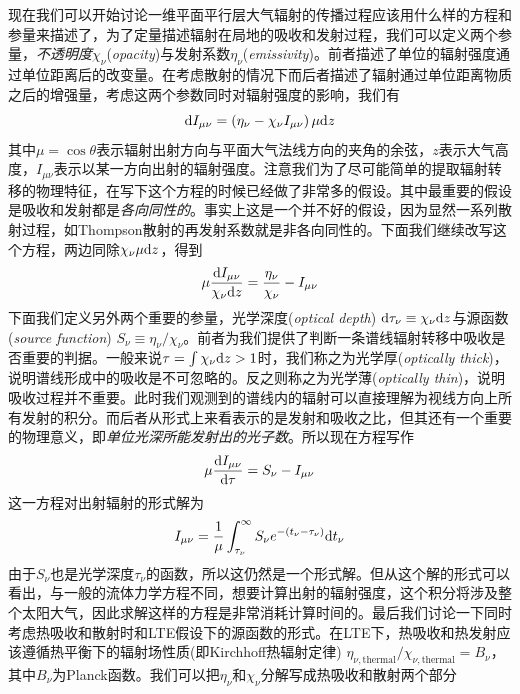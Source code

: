 现在我们可以开始讨论一维平面平行层大气辐射的传播过程应该用什么样的方程和参量来描述了，为了定量描述辐射在局地的吸收和发射过程，我们可以定义两个参量，\emph{不透明度}$\chi_\nu$(\textit{opacity})与发射系数$\eta_\nu$(\textit{emissivity})。前者描述了单位的辐射强度通过单位距离后的改变量。在考虑散射的情况下而后者描述了辐射通过单位距离物质之后的增强量，考虑这两个参数同时对辐射强度的影响，我们有
\begin{equation}
	\mathrm{d} I_{\mu\nu} = \left(\eta_{\nu} - \chi_{\nu}I_{\mu\nu}\right) \mu \mathrm{d} z
\end{equation}
其中$\mu=\cos\theta$表示辐射出射方向与平面大气法线方向的夹角的余弦，$z$表示大气高度，$I_{\mu \nu}$表示以某一方向出射的辐射强度。注意我们为了尽可能简单的提取辐射转移的物理特征，在写下这个方程的时候已经做了非常多的假设。其中最重要的假设是吸收和发射都是\emph{各向同性的}。事实上这是一个并不好的假设，因为显然一系列散射过程，如Thompson散射的再发射系数就是非各向同性的。下面我们继续改写这个方程，两边同除$\chi_\nu \mu \mathrm{d} z$，得到
\begin{equation}
	\mu \frac{\mathrm{d} I_{\mu \nu}}{\chi_\nu\mathrm{d} z} = \frac{\eta_\nu}{\chi_\nu} - I_{\mu \nu}
\end{equation}
下面我们定义另外两个重要的参量，光学深度(\textit{optical depth}) $\mathrm{d} \tau_\nu \equiv \chi_\nu \mathrm{d} z$与源函数(\textit{source function}) $S_\nu \equiv \eta_\nu / \chi_\nu$。前者为我们提供了判断一条谱线辐射转移中吸收是否重要的判据。一般来说$\tau = \int \chi_\nu \mathrm{d} z > 1$时，我们称之为光学厚(\textit{optically thick})，说明谱线形成中的吸收是不可忽略的。反之则称之为光学薄(\textit{optically thin})，说明吸收过程并不重要。此时我们观测到的谱线内的辐射可以直接理解为视线方向上所有发射的积分。而后者从形式上来看表示的是发射和吸收之比，但其还有一个重要的物理意义，即\emph{单位光深所能发射出的光子数}\parencites{Mihalas2014}。所以现在方程写作
\begin{equation}
	\mu \frac{\mathrm{d} I_{\mu \nu}}{\mathrm{d} \tau} = S_{\nu} - I_{\mu \nu}
\end{equation}
这一方程对出射辐射的形式解为
\begin{equation}
	I_{\mu \nu} = \frac{1}{\mu} \int^\infty_{\tau_\nu} S_{\nu} e^{-(t_\nu - \tau_\nu)} \mathrm{d} t_\nu \label{eq:1.6}
\end{equation}
由于$S_{\nu}$也是光学深度$\tau_\nu$的函数，所以这仍然是一个形式解。但从这个解的形式可以看出，与一般的流体力学方程不同，想要计算出射的辐射强度，这个积分将涉及整个太阳大气，因此求解这样的方程是非常消耗计算时间的。最后我们讨论一下同时考虑热吸收和散射时和LTE假设下的源函数的形式。在LTE下，热吸收和热发射应该遵循热平衡下的辐射场性质(即Kirchhoff热辐射定律) $\eta_{\nu,\mathrm{thermal}}/\chi_{\nu,\mathrm{thermal}} = B_{\nu}$，其中$B_\nu$为Planck函数。我们可以把$\eta_\nu$和$\chi_\nu$分解写成热吸收和散射两个部分
